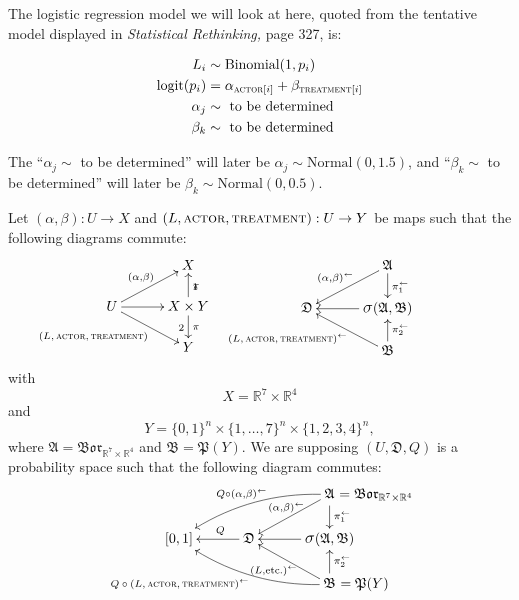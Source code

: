 \documentclass[
twoside=true,
paper=letter,
fontsize=11pt,
pagesize=auto,
leqno,
openany,
headsepline,
overfullrule,
]{scrbook}
\theoremstyle{plain}
\theoremstyle{plain}
\theoremstyle{definition}
\theoremstyle{bfnoteitalic}
\theoremstyle{bfnoteroman}
\newcommand{\sigalg}[1]{\mathfrak{#1}}
\newcommand{\borel}{\mathfrak{Bor}}
\newcommand{\sagb}{\mathop{\hbox{\large{$\sigma$}}}\nolimits}
\newcommand{\preimage}[1]{#1^{\leftarrow}}
\newcommand{\R}{\mathbb{R}}
\newcommand{\productsig}[2]{\sagb(#1,#2)}
\newcommand{\powerset}{\mathfrak{P}}
\newcommand{\measurespace}{X}
\newcommand{\measurespaceii}{Y}
\newcommand{\projectionone}{\pi_1}
\newcommand{\projectiontwo}{\pi_2}
\newcommand{\pspace}{\measurespace}%
\newcommand{\sspace}{\measurespaceii}%
\newcommand{\sspacesig}{\sigalg{B}}
\newcommand{\pspacesig}{\sigalg{A}}
\begin{document}
The logistic regression model we will look at here, 
quoted from the tentative model displayed in \textsl{Statistical Rethinking,} page 327, is:
\begin{quoting}\small
\begin{align*}
L_i & \sim \text{Binomial}(1,p_i) \\
\text{logit}(p_i) & = \alpha_{\textsc{actor}[i]} + \beta_{\textsc{treatment}[i]} \\
\alpha_j & \sim \text{ to be determined} \\
\beta_k & \sim \text{ to be determined} \\
\end{align*}
\end{quoting}
The ``$\alpha_j \sim$  to be determined'' will later be
$\alpha_j  \sim \text{Normal}(0,1.5)$, and
``$\beta_k  \sim$ to be determined'' will later be
$\beta_k  \sim \text{Normal}(0,0.5)$.


Let  $(\alpha, \beta):U\to\pspace$ and $(L,\textsc{actor}, \textsc{treatment}):U\to\sspace$ 
be maps such that the following diagrams commute:
\[
\xymatrix@R=16pt@C=30pt{ 
 & \pspace 
 \\
 U \ar[ur]^{(\alpha, \beta)} 
 \ar[dr]_{\llap{\scriptsize{$(L,\textsc{actor}, \textsc{treatment})$}}}
 \ar[r] & 
 \pspace\times\sspace \ar[u]_\projectionone \ar[d]^\projectiontwo
 \\
  & \sspace \\
}
%
\hspace{60pt}
%
\xymatrix@R=16pt@C=30pt{ 
 & \pspacesig
 \ar[dl]_{\preimage{(\alpha,\beta)}} 
 \ar[d]^{\preimage{\projectionone}}
 \\
 \sigalg{D}  & 
 \productsig{\pspacesig}{\sspacesig} 
 \ar[l]  
 \\
  & \sspacesig
  \ar[u]_{\preimage{\projectiontwo}}
  \ar[ul]^{\preimage{\llap{\scriptsize{$(L,\textsc{actor}, \textsc{treatment})$}}}}
  \\
}
\]
with
\[
\pspace = \R^7 \times \R^4
\]
and
\[
\sspace =
\{0,1\}^n \times \{ 1,\ldots,7 \}^n \times \{1,2,3,4 \}^n,
\]
where 
$\pspacesig = \borel_{\R^7 \times \R^4}$ and $\sspacesig=\powerset(\sspace)$.
We are supposing $(U,\sigalg{D},Q)$ is a probability space such that the following diagram commutes:
\[
\xymatrix@R=16pt@C=30pt{ 
 & & \pspacesig \rlap{ $=\borel_{\R^7\times\R^4}$}
 \ar[dl]_{\kern30pt\preimage{(\alpha,\beta)}} 
 \ar[d]^{\preimage{\projectionone}}
 \ar@/_10pt/[lld]_{Q\circ \preimage{(\alpha,\beta)}}
 \\
 [0,1] & \sigalg{D} \ar[l]_-{\ Q} & 
 \productsig{\pspacesig}{\sspacesig} 
 \ar[l]  
 \\
 & & \sspacesig \rlap{ $=\powerset(\sspace)$}
  \ar[u]_{\preimage{\projectiontwo}}
  \ar[ul]^{\preimage{(L,\text{etc.})}}
  \ar@/^10pt/[llu]^{\llap{\scriptsize{$Q\circ\preimage{(L,\textsc{actor},\textsc{treatment})}$}}}
  \\
}
\]
\end{document}
